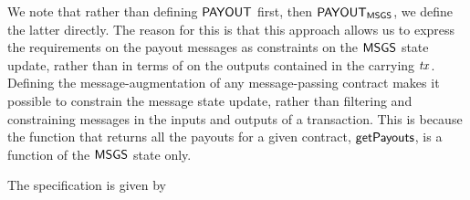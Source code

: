 We note that rather than defining $\mathsf{PAYOUT}$ first, then $\mathsf{PAYOUT}_{\mathsf{MSGS}}$, we
define the latter directly. The reason for this is that this approach allows
us to express the requirements on the payout messages as constraints on the
$\mathsf{MSGS}$ state update, rather than in terms of on the outputs contained in the
carrying $\mathit{tx}$. Defining the message-augmentation of any message-passing contract
makes it possible to constrain the message state update, rather than filtering
and constraining messages in the inputs and outputs of a transaction.
This is because the function that
returns all the payouts for a given contract, $\mathsf{getPayouts}$, is a function
of the $\mathsf{MSGS}$ state only.

%
%
%

The specification is given by

